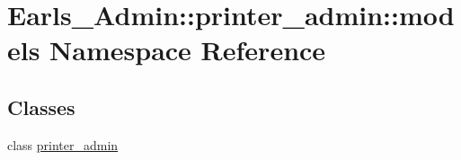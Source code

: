 \hypertarget{namespaceEarls__Admin_1_1printer__admin_1_1models}{
\section{Earls\_\-Admin::printer\_\-admin::models Namespace Reference}
\label{namespaceEarls__Admin_1_1printer__admin_1_1models}
}


\subsection*{Classes}
\begin{CompactItemize}
\item 
class \hyperlink{classEarls__Admin_1_1printer__admin_1_1models_1_1printer__admin}{printer\_\-admin}
\end{CompactItemize}
